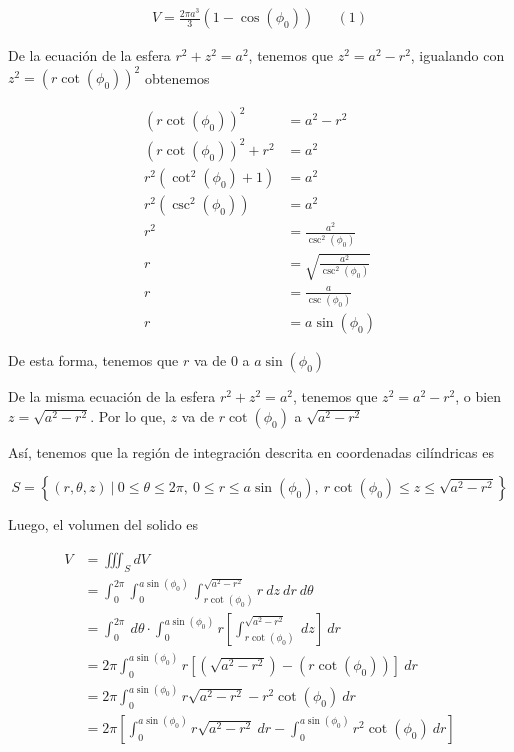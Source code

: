 \documentclass[12pt]{exam}
\begin{document}
\begin{questions}


  \begin{align*}
    V = \frac{2 \pi a^3}{3} (1 - \cos{(\phi_0)}) && (1)
  \end{align*}

  De la ecuación de la esfera $r^2 + z^2 = a^2$, tenemos que $z^2= a^2 - r^2$, igualando con $z^2 = (r\cot{(\phi_0)})^2$ obtenemos

  \begin{align*}
    (r\cot{(\phi_0)})^2 &=  a^2 - r^2\\
    (r\cot{(\phi_0)})^2 + r^2 &= a^2 \\
    r^2(\cot^2{(\phi_0)} + 1) &= a^2 \\
    r^2 (\csc^2{(\phi_0)}) &= a^2 \\
    r^2 &= \frac{a^2}{\csc^2{(\phi_0)}} \\
    r &= \sqrt{\frac{a^2}{\csc^2{(\phi_0)}}} \\
    r &= \frac{a}{\csc{(\phi_0)}} \\
    r &= a \sin{(\phi_0)}
  \end{align*}

  De esta forma, tenemos que $r$ va de 0 a $a\sin{(\phi_0)}$

  De la misma ecuación de la esfera $r^2 + z^2 = a^2$, tenemos que $z^2= a^2 - r^2$, o bien $z= \sqrt{a^2 - r^2}$. Por lo que,
  $z$ va de $r\cot{(\phi_0)}$ a $\sqrt{a^2 - r^2}$

  Así, tenemos que la región de integración descrita en coordenadas cilíndricas es

  \[
  S = \left\{(r,\theta, z)~|~0 \leq \theta \leq 2\pi,~0\leq r \leq a\sin{(\phi_0)},~r\cot{(\phi_0)} \leq z \leq \sqrt{a^2 - r^2} \right\}
  \]

  Luego, el volumen del solido es

  \begin{align*}
    V &= \iiint_S dV \\
    &= \int_0^{2\pi} \int_0^{a\sin{(\phi_0)}} \int_{r\cot{(\phi_0)}}^{\sqrt{a^2 - r^2}} r ~ dz ~ dr ~ d\theta \\
    &= \int_0^{2\pi} ~ d\theta \cdot \int_0^{a\sin{(\phi_0)}} r \left[\int_{r\cot{(\phi_0)}}^{\sqrt{a^2 - r^2}}~ dz\right]~dr \\
    &= 2\pi \int_0^{a\sin{(\phi_0)}} r [(\sqrt{a^2 - r^2}) - (r\cot{(\phi_0)})] ~ dr \\
    &= 2\pi \int_0^{a\sin{(\phi_0)}} r\sqrt{a^2 - r^2} - r^2 \cot{(\phi_0)} ~ dr \\
    &= 2\pi \left[\int_0^{a\sin{(\phi_0)}} r\sqrt{a^2 - r^2}~dr - \int_0^{a\sin{(\phi_0)}}r^2 \cot{(\phi_0)} ~ dr \right]
  \end{align*}


\end{questions}
\end{document}
